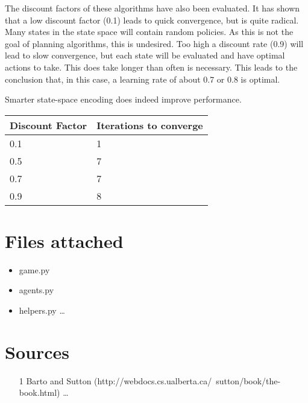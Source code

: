 \documentclass{article}
\begin{document}
The discount factors of these algorithms have also been evaluated. It has shown that a low discount factor (0.1) leads to quick convergence, but is quite radical. Many states in the state space will contain random policies. As this is not the goal of planning algorithms, this is undesired. Too high a discount rate (0.9) will lead to slow convergence, but each state will be evaluated and have optimal actions to take. This does take longer than often is necessary. This leads to the conclusion that, in this case, a learning rate of about 0.7 or 0.8 is optimal.

Smarter state-space encoding does indeed improve performance.



\begin{center}
	\begin{tabular}{ l || l }
		Discount Factor & Iterations to converge \\ 
		\hline
		0.1 & 1 \\
		0.5 & 7 \\
		0.7 & 7 \\
		0.9 & 8 \\	
	\end{tabular}
\end{center}



\section*{Files attached}
\begin{itemize}
\item game.py
\item agents.py
\item helpers.py \ldots
\end{itemize}
\section*{Sources}

\begin{itemize}
	\item [1] Barto and Sutton (http://webdocs.cs.ualberta.ca/~sutton/book/the-book.html) \ldots
\end{itemize}
\end{document}
